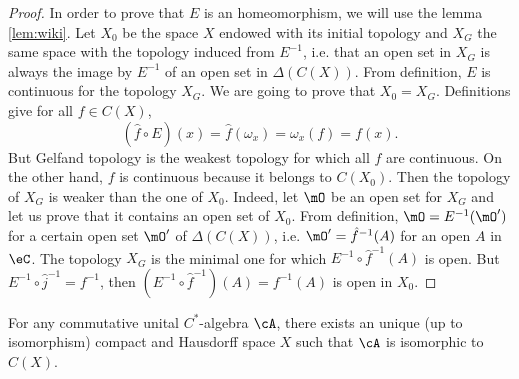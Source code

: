 \begin{proof}
	In order to prove that $E$ is an homeomorphism, we will use the lemma \ref{lem:wiki}. Let $X_0$ be the space $X$ endowed with its initial topology and $X_G$ the same space with the topology induced from $E^{-1}$, i.e. that an open set in $X_G$ is always the image by $E^{-1}$ of an open set in $\Delta(C(X))$. From definition, $E$ is continuous for the topology $X_G$. We are going to prove that $X_0=X_G$. Definitions give for all $f\in C(X)$,
	\[
		(\hat f\circ E)(x)=\hat f(\omega_x)=\omega_x(f)=f(x).
	\]
	But Gelfand topology is the weakest topology for which all $f$ are continuous. On the other hand, $f$ is continuous because it belongs to $C(X_0)$. Then the topology of $X_G$ is weaker than the one of $X_0$. Indeed, let $\mO$ be an open set for $X_G$ and let us prove that it contains an open set of $X_0$. From definition, $\mO=E^{-1}(\mO')$ for a certain open set $\mO'$ of $\Delta(C(X))$, i.e. $\mO'=\hat f^{-1}(A)$ for an open $A$ in $\eC$. The topology $X_G$ is the minimal one for which $E^{-1}\circ\hat f^{-1}(A)$ is open. But $E^{-1}\circ\hat j^{-1}=f^{-1}$, then $(E^{-1}\circ\hat f^{-1})(A)=f^{-1}(A)$ is open in $X_0$.
\end{proof}


\begin{theorem}    

	For any commutative unital $C^*$-algebra $\cA$, there exists an unique (up to isomorphism) compact and Hausdorff space $X$ such that  $\cA$ is isomorphic to $C(X)$.
	\label{thoGelfand}
\end{theorem}

